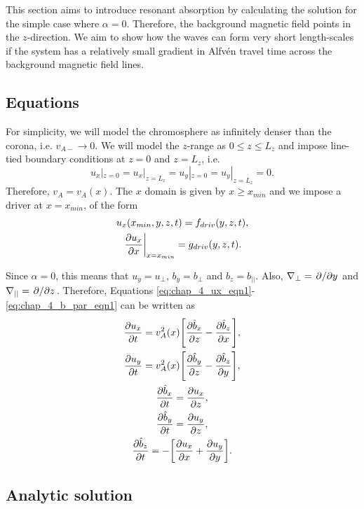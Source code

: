 This section aims to introduce resonant absorption by calculating the solution for the simple case where $\alpha=0$. Therefore, the background magnetic field points in the $z$-direction. We aim to show how the waves can form very short length-scales if the system has a relatively small gradient in Alfv\'en travel time across the background magnetic field lines.

\subsection{Equations}

For simplicity, we will model the chromosphere as infinitely denser than the corona, i.e. $v_{A-}\rightarrow 0$. We will model the $z$-range as $0\le z\le L_z$ and impose line-tied boundary conditions at $z=0$ and $z=L_z$, i.e. 
\begin{equation}
    u_x|_{z=0}=u_x|_{z=L_z}=u_y|_{z=0}=u_y|_{z=L_z}=0.
\end{equation}
Therefore, $v_A=v_A(x)$. The $x$ domain is given by $x\ge x_{min}$ and we impose a driver at $x=x_{min}$, of the form
\begin{gather}
    \label{eq:chap_4_x_min_bcs_alpha=0}
    u_x(x_{min},y,z,t) = f_{driv}(y,z,t), \\
    \left.\pdv{u_x}{x}\right|_{x=x_{min}} = g_{driv}(y,z,t).
\end{gather}

Since $\alpha=0$, this means that $u_y = u_\perp$, $b_y = b_{\perp}$ and $b_z = b_{||}$. Also, $\nabla_\perp=\pdv*{}{y}$ and $\nabla_{||}=\pdv*{}{z}$. Therefore, Equations \eqref{eq:chap_4_ux_eqn1}-\eqref{eq:chap_4_b_par_eqn1} can be written as
\begin{gather}
    \label{eq:chap_4_ux_eqn_alpha=0}
    \pdv{u_x}{t} = v_A^2(x)\qty[\pdv{\hat{b}_x}{z} - \pdv{\hat{b}_z}{x}],\\
    \pdv{u_y}{t} = v_A^2(x)\qty[\pdv{\hat{b}_y}{z} - \pdv{\hat{b}_z}{y}],\\
    \pdv{\hat{b}_x}{t} = \pdv{u_x}{z},\\
    \pdv{\hat{b}_y}{t} = \pdv{u_y}{z},\\
    \label{eq:chap_4_bz_eqn_alpha=0}
    \pdv{\hat{b}_z}{t} = -\qty[\pdv{u_x}{x} + \pdv{u_y}{y}].
\end{gather}

\subsection{Analytic solution}
\label{sec:chap_4_normal_mode_analytic_solution}


